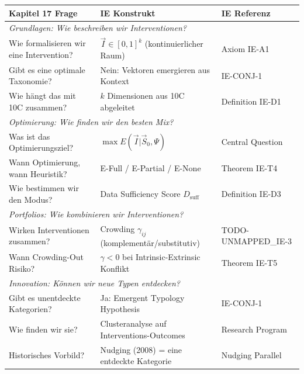 \begin{tcolorbox}[colback=purple!5!white, colframe=purple!75!black,
    title=Chapter Linkage]
\vspace{0.5em}
\begin{center}
\small
\begin{tabular}{p{4.5cm}p{4cm}p{3cm}}
\toprule
\textbf{Kapitel 17 Frage} & \textbf{IE Konstrukt} & \textbf{IE Referenz} \\
\midrule
\multicolumn{3}{l}{\textit{Grundlagen: Wie beschreiben wir Interventionen?}} \\
\midrule
Wie formalisieren wir eine Intervention? & $\vec{I} \in [0,1]^k$ (kontinuierlicher Raum) & Axiom IE-A1 \\
Gibt es eine optimale Taxonomie? & Nein: Vektoren emergieren aus Kontext & IE-CONJ-1 \\
Wie hängt das mit 10C zusammen? & $k$ Dimensionen aus 10C abgeleitet & Definition IE-D1 \\
\midrule
\multicolumn{3}{l}{\textit{Optimierung: Wie finden wir den besten Mix?}} \\
\midrule
Was ist das Optimierungsziel? & $\max E(\vec{I} | \vec{S}_0, \Psi)$ & Central Question \\
Wann Optimierung, wann Heuristik? & E-Full / E-Partial / E-None & Theorem IE-T4 \\
Wie bestimmen wir den Modus? & Data Sufficiency Score $D_{\text{suff}}$ & Definition IE-D3 \\
\midrule
\multicolumn{3}{l}{\textit{Portfolios: Wie kombinieren wir Interventionen?}} \\
\midrule
Wirken Interventionen zusammen? & Crowding $\gamma_{ij}$ (komplementär/substitutiv) & TODO-UNMAPPED_IE-3 \\
Wann Crowding-Out Risiko? & $\gamma < 0$ bei Intrinsic-Extrinsic Konflikt & Theorem IE-T5 \\
\midrule
\multicolumn{3}{l}{\textit{Innovation: Können wir neue Typen entdecken?}} \\
\midrule
Gibt es unentdeckte Kategorien? & Ja: Emergent Typology Hypothesis & IE-CONJ-1 \\
Wie finden wir sie? & Clusteranalyse auf Interventions-Outcomes & Research Program \\
Historisches Vorbild? & Nudging (2008) = eine entdeckte Kategorie & Nudging Parallel \\
\bottomrule
\end{tabular}
\end{center}


\end{tcolorbox}

